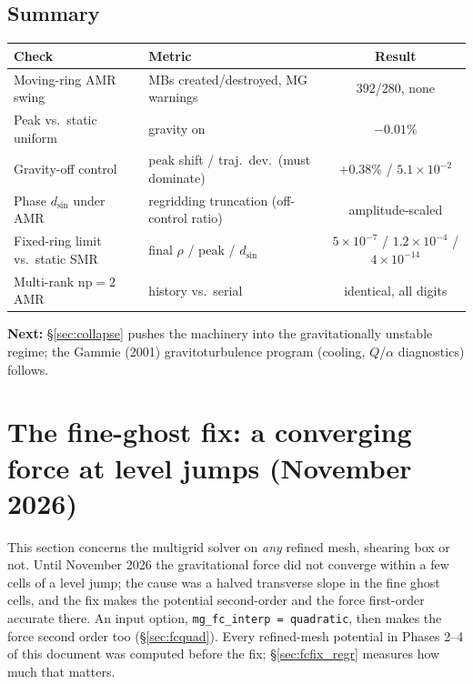 \documentclass[11pt]{article}
\newcommand{\code}[1]{\texttt{#1}}
\begin{document}
\subsection{Summary}
\begin{center}
\small
\begin{tabular}{@{}llc@{}}
\toprule
Check & Metric & Result \\
\midrule
Moving-ring AMR swing & MBs created/destroyed, MG warnings & $392$/$280$, none \\
Peak vs.\ static uniform & gravity on & $-0.01\%$ \\
Gravity-off control & peak shift / traj.\ dev.\ (must dominate) & $+0.38\%$ / $5.1\times10^{-2}$ \\
Phase $d_{\sin}$ under AMR & regridding truncation (off-control ratio) & amplitude-scaled \\
Fixed-ring limit vs.\ static SMR & final $\rho$ / peak / $d_{\sin}$ &
  $5\times10^{-7}$ / $1.2\times10^{-4}$ / $4\times10^{-14}$ \\
Multi-rank $\mathrm{np}=2$ AMR & history vs.\ serial & identical, all digits \\
\bottomrule
\end{tabular}
\end{center}

\noindent\textbf{Next:} \S\ref{sec:collapse} pushes the machinery into the
gravitationally unstable regime; the Gammie (2001) gravitoturbulence program
(cooling, $Q$/$\alpha$ diagnostics) follows.

\section{The fine-ghost fix: a converging force at level jumps (November 2026)}
\label{sec:fcfix}
This section concerns the multigrid solver on \emph{any} refined mesh, shearing box or
not. Until November 2026 the gravitational force did not converge within a few cells of a
level jump; the cause was a halved transverse slope in the fine ghost cells, and the fix
makes the potential second-order and the force first-order accurate there. An input option,
\code{mg\_fc\_interp = quadratic}, then makes the force second order too (\S\ref{sec:fcquad}). Every
refined-mesh potential in Phases 2--4 of this document was computed before the fix;
\S\ref{sec:fcfix_regr} measures how much that matters.
\end{document}
